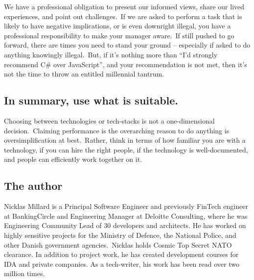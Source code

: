 \documentclass{article}
\begin{document}
    We have a professional obligation to present our informed views, share our lived experiences, and point out
    challenges.\ If we are asked to perform a task that is likely to have negative implications, or is even downright illegal,
    you have a professional responsibility to make your manager aware.\ If still pushed to go forward, there are times
    you need to stand your ground – especially if asked to do anything knowingly illegal.\ But, if it's nothing more than
    ``I'd strongly recommend C\# over JavaScript'', and your recommendation is not met, then it's not the time to throw
    an entitled millennial tantrum.

    \subsection*{\normalfont\sffamily In summary, use what is suitable.}
    
    Choosing between technologies or tech-stacks is not a one-dimensional decision.\ Claiming performance is the overarching
    reason to do anything is oversimplification at best.\ Rather, think in terms of how familiar you are with a technology,
    if you can hire the right people, if the technology is well-documented, and people can efficiently work together on it.
    
    
    \subsection*{\center\normalfont\sffamily The author}
    Nicklas Millard is a Principal Software Engineer and previously FinTech engineer at BankingCircle and 
    Engineering Manager at Deloitte Consulting, where he was Engineering Community Lead of 30 developers and architects. 
    He has worked on highly sensitive projects for the Ministry of Defence, the National Police, and other 
    Danish government agencies.\ Nicklas holds Cosmic Top Secret NATO clearance.
    In addition to project work, he has created development courses for IDA and private companies.
    As a tech-writer, his work has been read over two million times.
\end{document}
